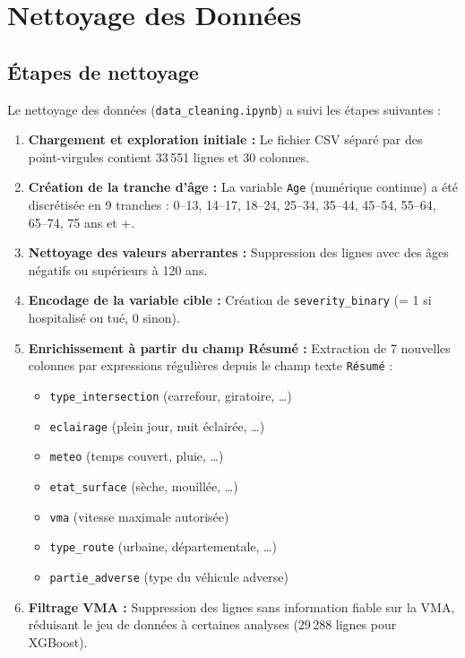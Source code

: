 \documentclass[12pt,a4paper]{article}
\begin{document}
\section{Nettoyage des Données}

\subsection{Étapes de nettoyage}

Le nettoyage des données (\texttt{data\_cleaning.ipynb}) a suivi les étapes
suivantes :

\begin{enumerate}[label=\textbf{\arabic*.}]
  \item \textbf{Chargement et exploration initiale :} Le fichier CSV séparé
        par des point-virgules contient 33\,551 lignes et 30 colonnes.

  \item \textbf{Création de la tranche d'âge :} La variable \texttt{Age}
        (numérique continue) a été discrétisée en 9 tranches :
        0--13, 14--17, 18--24, 25--34, 35--44, 45--54, 55--64, 65--74,
        75 ans et +.

  \item \textbf{Nettoyage des valeurs aberrantes :} Suppression des lignes
        avec des âges négatifs ou supérieurs à 120 ans.

  \item \textbf{Encodage de la variable cible :} Création de
        \texttt{severity\_binary} (= 1 si hospitalisé ou tué, 0 sinon).

  \item \textbf{Enrichissement à partir du champ Résumé :} Extraction de
        7 nouvelles colonnes par expressions régulières depuis le champ
        texte \texttt{Résumé} :
        \begin{itemize}
          \item \texttt{type\_intersection} (carrefour, giratoire, \ldots)
          \item \texttt{eclairage} (plein jour, nuit éclairée, \ldots)
          \item \texttt{meteo} (temps couvert, pluie, \ldots)
          \item \texttt{etat\_surface} (sèche, mouillée, \ldots)
          \item \texttt{vma} (vitesse maximale autorisée)
          \item \texttt{type\_route} (urbaine, départementale, \ldots)
          \item \texttt{partie\_adverse} (type du véhicule adverse)
        \end{itemize}

  \item \textbf{Filtrage VMA :} Suppression des lignes sans information
        fiable sur la VMA, réduisant le jeu de données à certaines
        analyses (29\,288 lignes pour XGBoost).
\end{enumerate}
\end{document}
